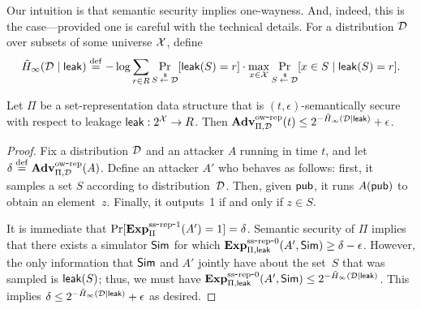 Our intuition is that semantic security implies one-wayness. And, indeed, this is
the case---provided one is careful with the technical details.
For a distribution ${\cal D}$
over subsets of some universe ${\cal X}$, define
\[\tilde H_\infty({\cal D} \mid {\sf leak}) \stackrel{\rm def}{=} -\log \sum_{r \in R} \Pr_{S {\:\stackrel{{\scriptscriptstyle \hspace{0.2em}\$}} {\leftarrow}\:} {\cal D}}[{\sf leak}(S)=r] \cdot
\max_{x \in {\cal X}} \Pr_{S {\:\stackrel{{\scriptscriptstyle \hspace{0.2em}\$}} {\leftarrow}\:} {\cal D}}[x \in S \mid {\sf leak}(S)=r].\]

\begin{theorem}
Let $\Pi$ be a set-representation data structure that is $(t, \epsilon)$-semantically secure
with respect to leakage ${\sf leak}:2^{\cal X} \rightarrow R$.
Then $\mathrm{\mathbf{Adv}}^{\mathrm{ow\mbox{-}rep}}_{\Pi,\mathcal{D}}(t) \leq 2^{-\tilde H_\infty({\cal D} \mid {\sf leak})} + \epsilon$.
\end{theorem}
\begin{proof}
Fix a distribution ${\cal D}$ and an attacker
$A$ running in time $t$, and let $\delta \stackrel{\rm def}{=} \mathrm{\mathbf{Adv}}^{\mathrm{ow\mbox{-}rep}}_{\Pi,\mathcal{D}}(A)$.
Define an attacker $A'$ who behaves as follows: first, it samples a set $S$ according to
distribution~${\cal D}$. Then, given ${\sf pub}$, it runs $A({\sf pub})$ to obtain an element~$z$.
Finally, it outputs~1 if and only if $z \in S$.

It is immediate that $\Pr[\mathrm{\mathbf{Exp}}^{\mathrm{ss\mbox{-}rep\mbox{-}1}}_{\Pi}(A')=1] = \delta$. Semantic
security of $\Pi$ implies that there exists a simulator ${\sf Sim}$ for which
$\mathrm{\mathbf{Exp}}^{\mathrm{ss\mbox{-}rep\mbox{-}0}}_{\Pi, {\sf leak}}(A', {\sf Sim}) \geq \delta - \epsilon$. However,
the only information
that ${\sf Sim}$
and $A'$ jointly have about the set~$S$ that was sampled is ${\sf leak}(S)$; thus,
we must have $\mathrm{\mathbf{Exp}}^{\mathrm{ss\mbox{-}rep\mbox{-}0}}_{\Pi, {\sf leak}}(A', {\sf Sim}) \leq 2^{-\tilde H_\infty({\cal D} \mid {\sf leak})}$.
This implies
$\delta \leq 2^{-\tilde H_\infty({\cal D} \mid {\sf leak})}+\epsilon$ as desired.
\end{proof}

